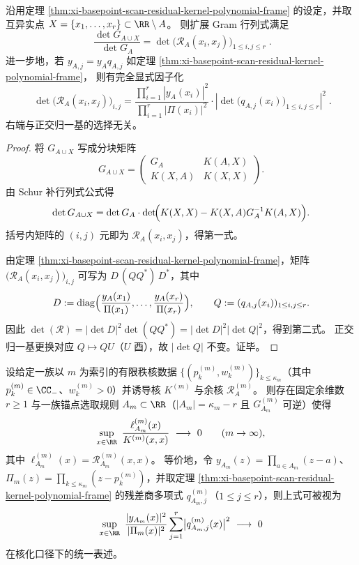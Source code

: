 \begin{proposition}\label{prop:xi-basepoint-scan-gram-plucker-residual-factorization}
沿用定理 \ref{thm:xi-basepoint-scan-residual-kernel-polynomial-frame} 的设定，并取互异实点
\(
X=\{x_1,\dots,x_r\}\subset\RR\setminus A
\)。
则扩展 Gram 行列式满足
\[
\boxed{\;
\frac{\det G_{A\cup X}}{\det G_A}
=\det\bigl(\mathcal{R}_A(x_i,x_j)\bigr)_{1\le i,j\le r}\; }.
\]
进一步地，若 \(y_{A,j}=y_A q_{A,j}\) 如定理 \ref{thm:xi-basepoint-scan-residual-kernel-polynomial-frame}，
则有完全显式因子化
\[
\boxed{\;
\det\bigl(\mathcal{R}_A(x_i,x_j)\bigr)_{i,j}
=
\frac{\prod_{i=1}^{r}|y_A(x_i)|^2}{\prod_{i=1}^{r}|\Pi(x_i)|^2}\cdot
\left|\det\bigl(q_{A,j}(x_i)\bigr)_{1\le i,j\le r}\right|^2\; }.
\]
右端与正交归一基的选择无关。
\end{proposition}
\begin{proof}
将 \(G_{A\cup X}\) 写成分块矩阵
\[
G_{A\cup X}=
\begin{pmatrix}
G_A & K(A,X)\\
K(X,A) & K(X,X)
\end{pmatrix}.
\]
由 Schur 补行列式公式得
\[
\det G_{A\cup X}=\det G_A\cdot \det\!\Bigl(K(X,X)-K(X,A)G_A^{-1}K(A,X)\Bigr).
\]
括号内矩阵的 \((i,j)\) 元即为 \(\mathcal{R}_A(x_i,x_j)\)，得第一式。
\par
由定理 \ref{thm:xi-basepoint-scan-residual-kernel-polynomial-frame}，矩阵 \(\bigl(\mathcal{R}_A(x_i,x_j)\bigr)_{i,j}\) 可写为
\(
D\,(Q Q^\ast)\,D^\ast
\)，其中
\[
D:=\mathrm{diag}\Bigl(\frac{y_A(x_1)}{\Pi(x_1)},\dots,\frac{y_A(x_r)}{\Pi(x_r)}\Bigr),
\qquad
Q:=(q_{A,j}(x_i))_{1\le i,j\le r}.
\]
因此
\(
\det(\mathcal{R})=|\det D|^2\det(QQ^\ast)=|\det D|^2|\det Q|^2
\)，得到第二式。
正交归一基更换对应 \(Q\mapsto Q U\)（\(U\) 酉），故 \(|\det Q|\) 不变。证毕。
\end{proof}

\begin{conjecture}[残差多项式范数的统一衰减机制]\label{conj:xi-basepoint-scan-residual-polynomial-norm-decay}
设给定一族以 \(m\) 为索引的有限秩核数据 \(\{(p_k^{(m)},w_k^{(m)})\}_{k\le \kappa_m}\)（其中 \(p_k^{(m)}\in\CC_-\)、\(w_k^{(m)}>0\)）并诱导核 \(K^{(m)}\) 与余核 \(\mathcal{R}_{A}^{(m)}\)。
则存在固定余维数 \(r\ge 1\) 与一族锚点选取规则 \(A_m\subset\RR\)（\(|A_m|=\kappa_m-r\) 且 \(G_{A_m}^{(m)}\) 可逆）使得
\[
\sup_{x\in\RR}\ \frac{\ell_{A_m}^{(m)}(x)}{K^{(m)}(x,x)}\ \longrightarrow\ 0\qquad(m\to\infty),
\]
其中 \(\ell_{A_m}^{(m)}(x)=\mathcal{R}_{A_m}^{(m)}(x,x)\)。
等价地，令 \(y_{A_m}(z)=\prod_{a\in A_m}(z-a)\)、\(\Pi_m(z)=\prod_{k\le\kappa_m}(z-p_k^{(m)})\)，并取定理 \ref{thm:xi-basepoint-scan-residual-kernel-polynomial-frame} 的残差商多项式 \(q_{A_m,j}^{(m)}\)（\(1\le j\le r\)），则上式可被视为
\[
\sup_{x\in\RR}\ \frac{|y_{A_m}(x)|^2}{|\Pi_m(x)|^2}\sum_{j=1}^{r}\bigl|q_{A_m,j}^{(m)}(x)\bigr|^2\ \longrightarrow\ 0
\]
在核化口径下的统一表述。
\end{conjecture}

